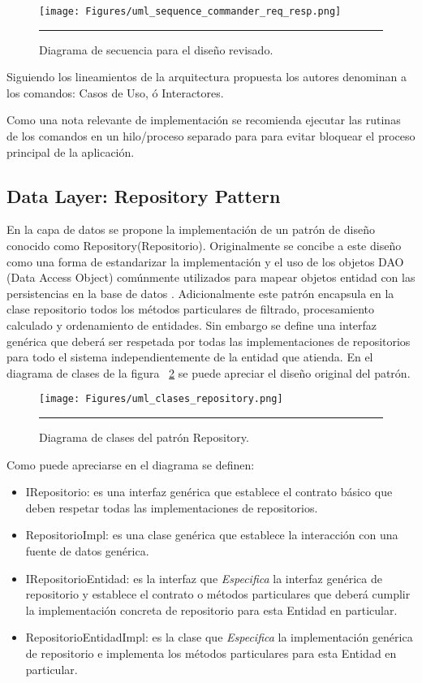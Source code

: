 \begin{figure}[htbp]
	\centering
	\texttt{[image: Figures/uml\_sequence\_commander\_req\_resp.png]}
	\rule{35em}{1pt}
	\caption[Commander Review]{Diagrama de secuencia para el diseño revisado.}
	\label{fig:uml_commander_sequence_req_resp}
\end{figure}

Siguiendo los lineamientos de la arquitectura propuesta los autores denominan a los comandos: Casos de Uso, ó Interactores.

Como una nota relevante de implementación se recomienda ejecutar las rutinas de los comandos en un hilo/proceso separado para para evitar bloquear el proceso principal de la aplicación.



\subsection{Data Layer: Repository Pattern}
En la capa de datos se propone la implementación de un patrón de diseño conocido como Repository(Repositorio). 
Originalmente se concibe a este diseño como una forma de estandarizar la implementación y el uso de los objetos DAO (Data Access Object) comúnmente utilizados para mapear objetos entidad con las persistencias en la base de datos \cite{repo_wolf}.
Adicionalmente este patrón encapsula en la clase repositorio todos los métodos particulares de filtrado, procesamiento calculado y ordenamiento de entidades.
Sin embargo se define una interfaz genérica que deberá ser respetada por todas las implementaciones de repositorios para todo el sistema independientemente de la entidad que atienda.
En el diagrama de clases de la figura ~\ref{fig:uml_clases_repository} se puede apreciar el diseño original del patrón.

\begin{figure}[htbp]
	\centering
	\texttt{[image: Figures/uml\_clases\_repository.png]}
	\rule{35em}{1pt}
	\caption[Repository Pattern Class Diagram]{Diagrama de clases del patrón Repository.}
	\label{fig:uml_clases_repository}
\end{figure}

Como puede apreciarse en el diagrama se definen:
\begin{itemize}
	\item IRepositorio: es una interfaz genérica que establece el contrato básico que deben respetar todas las implementaciones de repositorios.
	\item RepositorioImpl: es una clase genérica que establece la interacción con una fuente de datos genérica.
	\item IRepositorioEntidad: es la interfaz que \textit{Especifica} la interfaz genérica de repositorio y establece el contrato o métodos particulares que deberá cumplir la implementación concreta de repositorio para esta Entidad en particular.
	\item RepositorioEntidadImpl: es la clase que \textit{Especifica} la implementación genérica de repositorio e implementa los métodos particulares para esta Entidad en particular.
\end{itemize}

